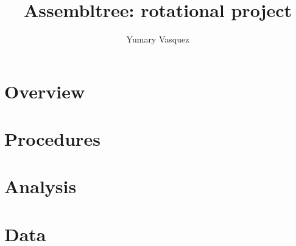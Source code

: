 \documentclass[letterpaper,12pt]{article}
\begin{document}
\title{Assembltree: rotational project}
\author{Yumary Vasquez}
\maketitle




\section{Overview}





\section{Procedures}


\section{Analysis}


\section{Data}
\end{document}
